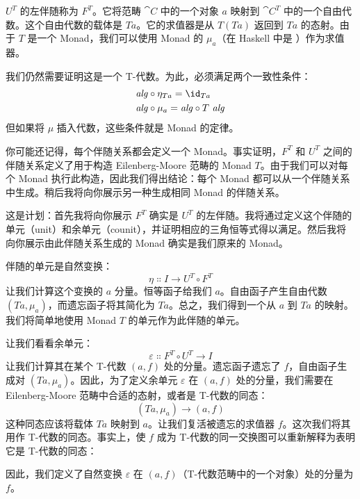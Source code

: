 $U^T$ 的左伴随称为 $F^T$。它将范畴 $\cat{C}$ 中的一个对象 $a$ 映射到 $\cat{C}^T$ 中的一个自由代数。这个自由代数的载体是 $T a$。它的求值器是从 $T (T a)$ 返回到 $T a$ 的态射。由于 $T$ 是一个 Monad，我们可以使用 Monad 的 $\mu_a$（在 Haskell 中是 ）作为求值器。

我们仍然需要证明这是一个 T-代数。为此，必须满足两个一致性条件：
\begin{align*}
  \mathit{alg} & \circ \eta_{Ta} = \id_{Ta}     \\
  \mathit{alg} & \circ \mu_a = \mathit{alg} \circ T\ \mathit{alg}
\end{align*}
但如果将 $\mu$ 插入代数，这些条件就是 Monad 的定律。

你可能还记得，每个伴随关系都会定义一个 Monad。事实证明，$F^T$ 和 $U^T$ 之间的伴随关系定义了用于构造 Eilenberg-Moore 范畴的 Monad $T$。由于我们可以对每个 Monad 执行此构造，因此我们得出结论：每个 Monad 都可以从一个伴随关系中生成。稍后我将向你展示另一种生成相同 Monad 的伴随关系。

这是计划：首先我将向你展示 $F^T$ 确实是 $U^T$ 的左伴随。我将通过定义这个伴随的单元（unit）和余单元（counit），并证明相应的三角恒等式得以满足。然后我将向你展示由此伴随关系生成的 Monad 确实是我们原来的 Monad。

伴随的单元是自然变换：
\[\eta \Colon I \to U^T \circ F^T\]
让我们计算这个变换的 $a$ 分量。恒等函子给我们 $a$。自由函子产生自由代数 $(T a, \mu_a)$，而遗忘函子将其简化为 $T a$。总之，我们得到一个从 $a$ 到 $T a$ 的映射。我们将简单地使用 Monad $T$ 的单元作为此伴随的单元。

让我们看看余单元：
\[\varepsilon \Colon F^T \circ U^T \to I\]
让我们计算其在某个 T-代数 $(a, f)$ 处的分量。遗忘函子遗忘了 $f$，自由函子生成对 $(T a, \mu_a)$。因此，为了定义余单元 $\varepsilon$ 在 $(a, f)$ 处的分量，我们需要在 Eilenberg-Moore 范畴中合适的态射，或者是 T-代数的同态：
\[(T a, \mu_a) \to (a, f)\]
这种同态应该将载体 $T a$ 映射到 $a$。让我们复活被遗忘的求值器 $f$。这次我们将其用作 T-代数的同态。事实上，使 $f$ 成为 T-代数的同一交换图可以重新解释为表明它是 T-代数的同态：

\begin{figure}[H]
  \centering
\end{figure}

\noindent
因此，我们定义了自然变换 $\varepsilon$ 在 $(a, f)$（T-代数范畴中的一个对象）处的分量为 $f$。

